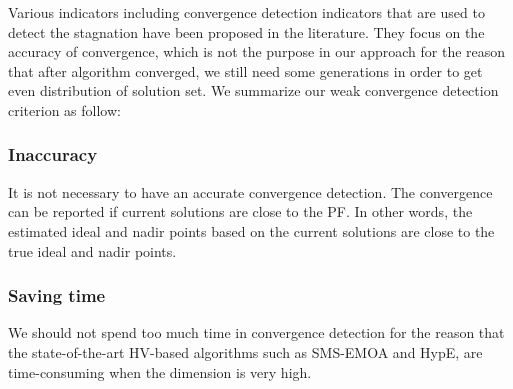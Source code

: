 \documentclass[conference]{IEEEtran}
\begin{document}
%
%
%
Various indicators including convergence detection indicators that are used to detect the stagnation 
have been proposed in the literature\cite{convergenceDetection:1, convergenceDetection:LSSC, 
convergenceDetection:OCD, convergenceDetection:OFCDandOCD, convergenceDetection:convergenceMetric, 
convergenceDetection:maxCD, convergenceDetection:online}. 
They focus on the accuracy of convergence, which is not the purpose in our approach for 
the reason that after algorithm converged, we still need some generations in order to
get even distribution of solution set. 
We summarize our weak convergence detection criterion as follow:
\subsubsection{Inaccuracy} It is not necessary to have an accurate convergence detection. 
The convergence can be reported if current solutions are close to the PF.
In other words, the estimated ideal and nadir points based on the current solutions
are close to the true ideal and nadir points. 
\subsubsection{Saving time} We should not spend too much time in convergence detection
for the reason that the state-of-the-art HV-based algorithms such as SMS-EMOA and HypE, 
are time-consuming when the dimension is very high. 
\end{document}

